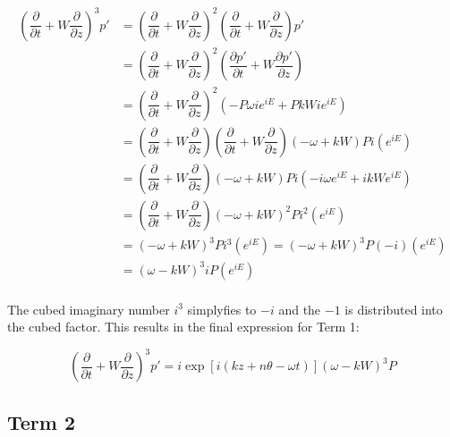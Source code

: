 \documentclass[]{aiaa-tc}%
\begin{document}
\begin{align*}
\left( \dfrac{\partial}{\partial t} + W \dfrac{\partial}{\partial z} \right)^3 p'
&= \left( \dfrac{\partial}{\partial t} + W \dfrac{\partial}{\partial z}
   \right)^2
   \left( \dfrac{\partial}{\partial t} + W \dfrac{\partial}{\partial z}
   \right)p' \\
&= \left( \dfrac{\partial}{\partial t} + W \dfrac{\partial}{\partial z}
   \right)^2
   \left( \dfrac{\partial p'}{\partial t} + W \dfrac{\partial p'}{\partial z}
   \right) \\
&= \left( \dfrac{\partial}{\partial t} + W \dfrac{\partial}{\partial z}
   \right)^2
   \left( -P\omega ie^{iE} + PkW ie^{iE}
   \right) \\
&= \left( \dfrac{\partial}{\partial t} + W \dfrac{\partial}{\partial z}
   \right)
   \left( \dfrac{\partial}{\partial t} + W \dfrac{\partial}{\partial z}
   \right) (-\omega + kW)P i (e^{iE}) \\
&= \left( \dfrac{\partial}{\partial t} + W \dfrac{\partial}{\partial z}
   \right) (-\omega + kW)P i
   (-i\omega e^{iE} + ikW e^{iE}) \\
&= \left( \dfrac{\partial}{\partial t} + W \dfrac{\partial}{\partial z}
   \right) (-\omega + kW)^2 P i^2 (e^{iE}) \\
&= (-\omega + kW)^3 P i^3(e^{iE}) = (-\omega + kW)^3P(-i) (e^{iE}) \\
&= (\omega - kW)^3iP (e^{iE}) \\
\end{align*}

The cubed imaginary number $i^3$ simplyfies to $-i$ and the $-1$ is distributed into the cubed factor.  This results in the final expression for Term 1:

\begin{equation} \label{term1soln}
\boxed{ \left( \dfrac{\partial}{\partial t}
          + W \dfrac{\partial}{\partial z} \right)^3 p'
    =  i\exp[i(kz + n\theta -\omega t)] (\omega - kW)^3 P}
\end{equation}





\clearpage
\subsection{Term 2}
\end{document}

